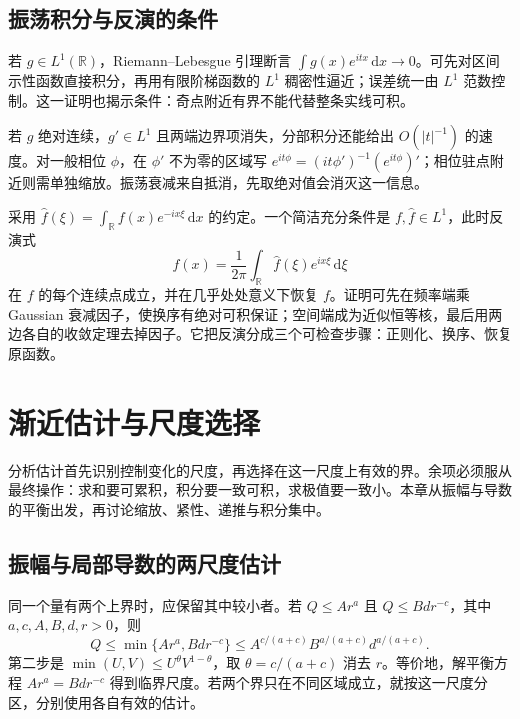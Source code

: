 \documentclass[12pt,fontset=fandol]{ctexart}
\begin{document}
\subsection{振荡积分与反演的条件}

\label{app:integration-inversion}

若 $g\in L^1(\mathbb R)$，Riemann--Lebesgue 引理断言 $\int g(x)e^{itx}\,\mathrm dx\to0$。可先对区间示性函数直接积分，再用有限阶梯函数的 $L^1$ 稠密性逼近；误差统一由 $L^1$ 范数控制。这一证明也揭示条件：奇点附近有界不能代替整条实线可积。

若 $g$ 绝对连续，$g'\in L^1$ 且两端边界项消失，分部积分还能给出 $O(|t|^{-1})$ 的速度。对一般相位 $\phi$，在 $\phi'$ 不为零的区域写 $e^{it\phi}=(it\phi')^{-1}(e^{it\phi})'$；相位驻点附近则需单独缩放。振荡衰减来自抵消，先取绝对值会消灭这一信息。

采用 $\widehat f(\xi)=\int_{\mathbb R}f(x)e^{-ix\xi}\,\mathrm dx$ 的约定。一个简洁充分条件是 $f,\widehat f\in L^1$，此时反演式
\[
f(x)=\frac1{2\pi}\int_{\mathbb R}\widehat f(\xi)e^{ix\xi}\,\mathrm d\xi
\]
在 $f$ 的每个连续点成立，并在几乎处处意义下恢复 $f$。证明可先在频率端乘 Gaussian 衰减因子，使换序有绝对可积保证；空间端成为近似恒等核，最后用两边各自的收敛定理去掉因子。它把反演分成三个可检查步骤：正则化、换序、恢复原函数。



\section{渐近估计与尺度选择}

\label{app:estimates}

分析估计首先识别控制变化的尺度，再选择在这一尺度上有效的界。余项必须服从最终操作：求和要可累积，积分要一致可积，求极值要一致小。本章从振幅与导数的平衡出发，再讨论缩放、紧性、递推与积分集中。

\subsection{振幅与局部导数的两尺度估计}

\label{app:estimate-holder}

同一个量有两个上界时，应保留其中较小者。若 $Q\le A r^a$ 且 $Q\le B d r^{-c}$，其中 $a,c,A,B,d,r>0$，则
\[
Q\le\min\{A r^a,Bd r^{-c}\}
\le A^{c/(a+c)}B^{a/(a+c)}d^{a/(a+c)}.
\]
第二步是 $\min(U,V)\le U^\theta V^{1-\theta}$，取 $\theta=c/(a+c)$ 消去 $r$。等价地，解平衡方程 $A r^a=Bd r^{-c}$ 得到临界尺度。若两个界只在不同区域成立，就按这一尺度分区，分别使用各自有效的估计。
\end{document}
